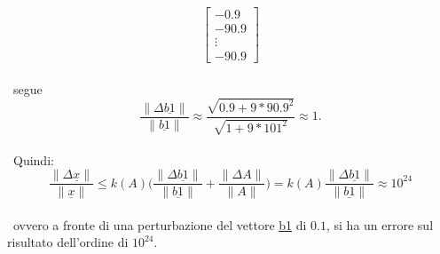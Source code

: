 \begin{itemize}
\begin{itemize}
\[\begin{bmatrix}
				-0.9 \\
				-90.9 \\
				\vdots \\
				-90.9
				\end{bmatrix}
			\]\\\
			segue
			\[
				\frac{\|\Delta\underline{b1}\|}{\|\underline{b1}\|}\approx \frac{\sqrt{0.9+9*90.9^2}}{\sqrt{1+9*101^2}}\approx 1. 
			\]\\\
			Quindi:
			\[
				\frac{\|\Delta\underline{x}\|}{\|\underline{x}\|}\leq k(A)\Bigg(\frac{\|\Delta\underline{b1}\|}{\|\underline{b1}\|}+\frac{\|\Delta A\|}{\|{A}\|}\Bigg) = k(A)\frac{\|\Delta\underline{b1}\|}{\|\underline{b1}\|}\approx 10^{24}
			\]\\\
			ovvero a fronte di una perturbazione del vettore \underline{b1} di $0.1$, si ha un errore sul risultato dell'ordine di $10^{24}$.
	\end{itemize}
\end{itemize}